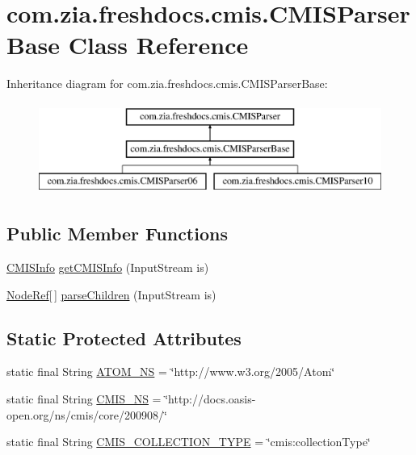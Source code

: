 \hypertarget{classcom_1_1zia_1_1freshdocs_1_1cmis_1_1_c_m_i_s_parser_base}{\section{com.\-zia.\-freshdocs.\-cmis.\-C\-M\-I\-S\-Parser\-Base Class Reference}
\label{classcom_1_1zia_1_1freshdocs_1_1cmis_1_1_c_m_i_s_parser_base}
}
Inheritance diagram for com.\-zia.\-freshdocs.\-cmis.\-C\-M\-I\-S\-Parser\-Base\-:\begin{figure}[H]
\begin{center}
\leavevmode
\includegraphics[height=3.000000cm]{classcom_1_1zia_1_1freshdocs_1_1cmis_1_1_c_m_i_s_parser_base}
\end{center}
\end{figure}
\subsection*{Public Member Functions}
\begin{DoxyCompactItemize}
\item 
\hyperlink{classcom_1_1zia_1_1freshdocs_1_1cmis_1_1_c_m_i_s_info}{C\-M\-I\-S\-Info} \hyperlink{classcom_1_1zia_1_1freshdocs_1_1cmis_1_1_c_m_i_s_parser_base_a6562b4cb94c49abf02cfb0e4a3ebc435}{get\-C\-M\-I\-S\-Info} (Input\-Stream is)
\item 
\hyperlink{classcom_1_1zia_1_1freshdocs_1_1model_1_1_node_ref}{Node\-Ref}\mbox{[}$\,$\mbox{]} \hyperlink{classcom_1_1zia_1_1freshdocs_1_1cmis_1_1_c_m_i_s_parser_base_aba47add9015da6e4705835f55d54cc9e}{parse\-Children} (Input\-Stream is)
\end{DoxyCompactItemize}
\subsection*{Static Protected Attributes}
\begin{DoxyCompactItemize}
\item 
static final String \hyperlink{classcom_1_1zia_1_1freshdocs_1_1cmis_1_1_c_m_i_s_parser_base_a86db5dbe71e3e8cf5e89fcf101a4b51e}{A\-T\-O\-M\-\_\-\-N\-S} = \char`\"{}http\-://www.\-w3.\-org/2005/Atom\char`\"{}
\item 
static final String \hyperlink{classcom_1_1zia_1_1freshdocs_1_1cmis_1_1_c_m_i_s_parser_base_ac51f941d96f4665be4cf8bd6882089a1}{C\-M\-I\-S\-\_\-\-N\-S} = \char`\"{}http\-://docs.\-oasis-\/open.\-org/ns/cmis/core/200908/\char`\"{}
\item 
static final String \hyperlink{classcom_1_1zia_1_1freshdocs_1_1cmis_1_1_c_m_i_s_parser_base_aeefc666c494696c9be4e5a0a33a2d599}{C\-M\-I\-S\-\_\-\-C\-O\-L\-L\-E\-C\-T\-I\-O\-N\-\_\-\-T\-Y\-P\-E} = \char`\"{}cmis\-:collection\-Type\char`\"{}
\end{DoxyCompactItemize}



